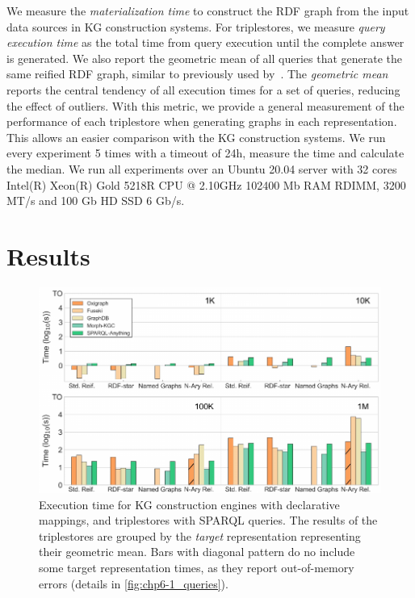 We measure the \textit{materialization time} to construct the RDF graph from the input data sources in KG construction systems.
For triplestores, we measure \textit{query execution time} as the total time from query execution until the complete answer is generated. 
We also report the geometric mean of all queries that generate the same reified RDF graph, similar to previously used by~\cite{morsey2011dbpedia,schmidt2009sp}. 
The \textit{geometric mean} reports the central tendency of all execution times for a set of queries, reducing the effect of outliers. 
With this metric, we provide a general measurement of the performance of each triplestore when generating graphs in each representation. 
This allows an easier comparison with the KG construction systems. 
We run every experiment 5 times with a timeout of 24h, measure the time and calculate the median.
We run all experiments over an Ubuntu 20.04 server with
32 cores Intel(R) Xeon(R) Gold 5218R CPU @ 2.10GHz
102400 Mb RAM RDIMM, 3200 MT/s and 
100 Gb HD SSD 6 Gb/s. 




\section{Results}
\label{sec:chp6-1_results}


\begin{figure}[t!]
    \centering
    \includegraphics[width=\linewidth]{figures/chp6-1_results-map-queries.pdf}
    \caption[Overall execution times of KG re-construction evaluation]{Execution time for KG construction engines with declarative mappings, and triplestores with SPARQL queries. The results of the triplestores are grouped by the \textit{target} representation representing their geometric mean. Bars with diagonal pattern do no include some target representation times, as they report out-of-memory errors (details in \cref{fig:chp6-1_queries}).}
    \label{fig:chp6-1_map-queries}
\end{figure}



